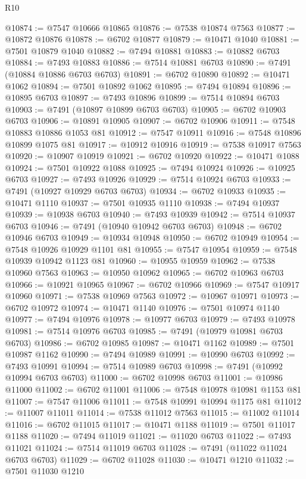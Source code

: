 \begin{lexlean}{R10}
\begin{coremodule}
@10874 := @7547 @10666 @10865
@10876 := @7538 @10874 @7563
@10877 := @10872 @10876
@10878 := @6702 @10877
@10879 := @10471 @1040
@10881 := @7501 @10879 @1040
@10882 := @7494 @10881
@10883 := @10882 @6703
@10884 := @7493 @10883
@10886 := @7514 @10881 @6703
@10890 := @7491 (@10884 @10886 @6703 @6703)
@10891 := @6702 @10890
@10892 := @10471 @1062
@10894 := @7501 @10892 @1062
@10895 := @7494 @10894
@10896 := @10895 @6703
@10897 := @7493 @10896
@10899 := @7514 @10894 @6703
@10903 := @7491 (@10897 @10899 @6703 @6703)
@10905 := @6702 @10903 @6703
@10906 := @10891 @10905
@10907 := @6702 @10906
@10911 := @7548 @10883 @10886 @1053 @81
@10912 := @7547 @10911
@10916 := @7548 @10896 @10899 @1075 @81
@10917 := @10912 @10916
@10919 := @7538 @10917 @7563
@10920 := @10907 @10919
@10921 := @6702 @10920
@10922 := @10471 @1088
@10924 := @7501 @10922 @1088
@10925 := @7494 @10924
@10926 := @10925 @6703
@10927 := @7493 @10926
@10929 := @7514 @10924 @6703
@10933 := @7491 (@10927 @10929 @6703 @6703)
@10934 := @6702 @10933
@10935 := @10471 @1110
@10937 := @7501 @10935 @1110
@10938 := @7494 @10937
@10939 := @10938 @6703
@10940 := @7493 @10939
@10942 := @7514 @10937 @6703
@10946 := @7491 (@10940 @10942 @6703 @6703)
@10948 := @6702 @10946 @6703
@10949 := @10934 @10948
@10950 := @6702 @10949
@10954 := @7548 @10926 @10929 @1101 @81
@10955 := @7547 @10954
@10959 := @7548 @10939 @10942 @1123 @81
@10960 := @10955 @10959
@10962 := @7538 @10960 @7563
@10963 := @10950 @10962
@10965 := @6702 @10963 @6703
@10966 := @10921 @10965
@10967 := @6702 @10966
@10969 := @7547 @10917 @10960
@10971 := @7538 @10969 @7563
@10972 := @10967 @10971
@10973 := @6702 @10972
@10974 := @10471 @1140
@10976 := @7501 @10974 @1140
@10977 := @7494 @10976
@10978 := @10977 @6703
@10979 := @7493 @10978
@10981 := @7514 @10976 @6703
@10985 := @7491 (@10979 @10981 @6703 @6703)
@10986 := @6702 @10985
@10987 := @10471 @1162
@10989 := @7501 @10987 @1162
@10990 := @7494 @10989
@10991 := @10990 @6703
@10992 := @7493 @10991
@10994 := @7514 @10989 @6703
@10998 := @7491 (@10992 @10994 @6703 @6703)
@11000 := @6702 @10998 @6703
@11001 := @10986 @11000
@11002 := @6702 @11001
@11006 := @7548 @10978 @10981 @1153 @81
@11007 := @7547 @11006
@11011 := @7548 @10991 @10994 @1175 @81
@11012 := @11007 @11011
@11014 := @7538 @11012 @7563
@11015 := @11002 @11014
@11016 := @6702 @11015
@11017 := @10471 @1188
@11019 := @7501 @11017 @1188
@11020 := @7494 @11019
@11021 := @11020 @6703
@11022 := @7493 @11021
@11024 := @7514 @11019 @6703
@11028 := @7491 (@11022 @11024 @6703 @6703)
@11029 := @6702 @11028
@11030 := @10471 @1210
@11032 := @7501 @11030 @1210

\end{coremodule}
\end{lexlean}
